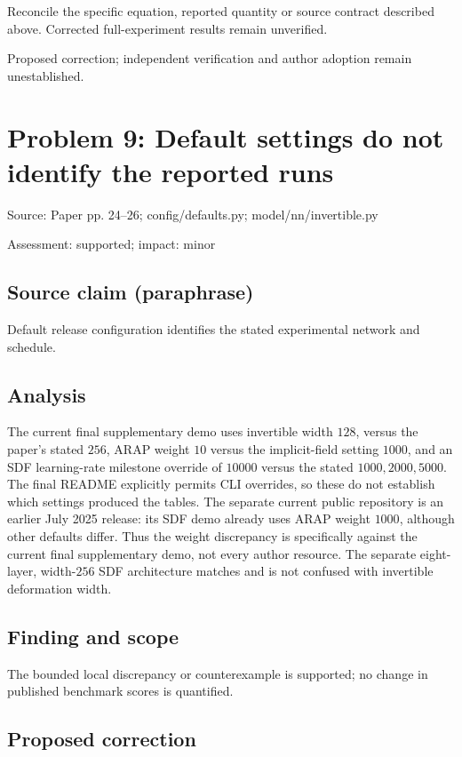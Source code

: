 \documentclass[11pt]{article}
\begin{document}
Reconcile the specific equation, reported quantity or source contract described above. Corrected full-experiment results remain unverified.

Proposed correction; independent verification and author adoption remain unestablished.

\section*{Problem 9: Default settings do not identify the reported runs}

Source: Paper pp. 24–26; config/defaults.py; model/nn/invertible.py

Assessment: supported; impact: minor

\subsection*{Source claim (paraphrase)}

Default release configuration identifies the stated experimental network and schedule.

\subsection*{Analysis}

The current final supplementary demo uses invertible width \(128\), versus the paper’s stated \(256\), ARAP weight \(10\) versus the implicit-field setting \(1000\), and an SDF learning-rate milestone override of \(10000\) versus the stated \(1000,2000,5000\). The final README explicitly permits CLI overrides, so these do not establish which settings produced the tables. The separate current public repository is an earlier July 2025 release: its SDF demo already uses ARAP weight \(1000\), although other defaults differ. Thus the weight discrepancy is specifically against the current final supplementary demo, not every author resource. The separate eight-layer, width-\(256\) SDF architecture matches and is not confused with invertible deformation width.

\subsection*{Finding and scope}

The bounded local discrepancy or counterexample is supported; no change in published benchmark scores is quantified.

\subsection*{Proposed correction}
\end{document}

